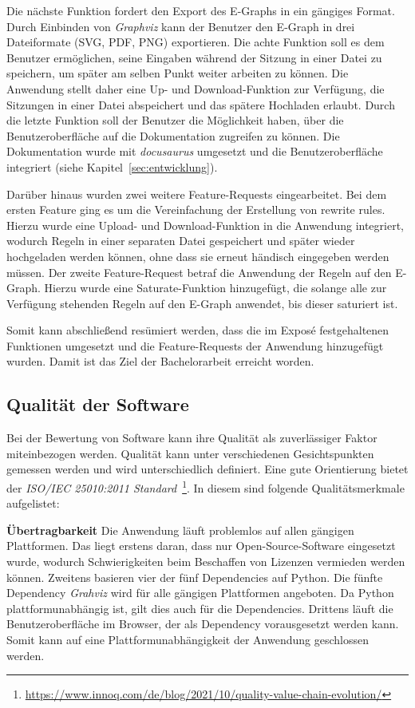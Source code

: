 Die nächste Funktion fordert den Export des E-Graphs in ein gängiges Format. Durch Einbinden von \textit{Graphviz} kann der Benutzer den E-Graph in drei Dateiformate (SVG, PDF, PNG) exportieren.
Die achte Funktion soll es dem Benutzer ermöglichen, seine Eingaben während der Sitzung in einer Datei zu speichern, um später am selben Punkt weiter arbeiten zu können.
Die Anwendung stellt daher eine Up- und Download-Funktion zur Verfügung, die Sitzungen in einer Datei abspeichert und das spätere Hochladen erlaubt.
Durch die letzte Funktion soll der Benutzer die Möglichkeit haben, über die Benutzeroberfläche auf die Dokumentation zugreifen zu können. Die Dokumentation wurde mit \textit{docusaurus}
umgesetzt und die Benutzeroberfläche integriert (siehe Kapitel~\ref{sec:entwicklung}).

Darüber hinaus wurden zwei weitere Feature-Requests eingearbeitet. 
Bei dem ersten Feature ging es um die Vereinfachung der Erstellung von rewrite rules. Hierzu wurde eine Upload- und Download-Funktion in die Anwendung integriert, wodurch
Regeln in einer separaten Datei gespeichert und später wieder hochgeladen werden können, ohne dass sie erneut händisch eingegeben werden müssen.
Der zweite Feature-Request betraf die Anwendung der Regeln auf den E-Graph. Hierzu wurde eine Saturate-Funktion hinzugefügt, die solange alle zur Verfügung stehenden
Regeln auf den E-Graph anwendet, bis dieser saturiert ist.

Somit kann abschließend resümiert werden, dass die im Exposé festgehaltenen Funktionen umgesetzt und die Feature-Requests der Anwendung hinzugefügt wurden.
Damit ist das Ziel der Bachelorarbeit erreicht worden.

\subsection{Qualität der Software}\label{softwarequalität}

Bei der Bewertung von Software kann ihre Qualität als zuverlässiger Faktor miteinbezogen werden. Qualität kann unter verschiedenen Gesichtspunkten gemessen werden und wird
unterschiedlich definiert. Eine gute Orientierung bietet der \textit{ISO/IEC 25010:2011 Standard}~\footnote{\hspace{1.5mm}\url{https://www.innoq.com/de/blog/2021/10/quality-value-chain-evolution/}}. 
In diesem sind folgende Qualitätsmerkmale aufgelistet:

\noindent\textbf{Übertragbarkeit} Die Anwendung läuft problemlos auf allen gängigen Plattformen. Das liegt erstens daran, dass nur Open-Source-Software eingesetzt wurde,
wodurch Schwierigkeiten beim Beschaffen von Lizenzen vermieden werden können. 
Zweitens basieren vier der fünf Dependencies auf Python. Die fünfte Dependency \textit{Grahviz} wird für alle gängigen Plattformen angeboten. Da Python plattformunabhängig ist, gilt dies auch
für die Dependencies.
Drittens läuft die Benutzeroberfläche im Browser, der als Dependency vorausgesetzt werden kann.
Somit kann auf eine Plattformunabhängigkeit der Anwendung geschlossen werden.

